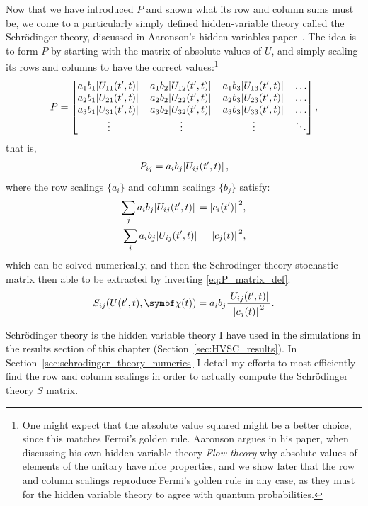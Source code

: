 Now that we have introduced $P$ and shown what its row and column sums must be, we come to a particularly simply defined hidden-variable theory called the Schr\"odinger theory, discussed in Aaronson's hidden variables paper~\cite{PhysRevA.71.032325}. The idea is to form $P$ by starting with the matrix of absolute values of $U$, and simply scaling its rows and columns to have the correct values:\footnote{One might expect that the absolute value squared might be a better choice, since this matches Fermi's golden rule. Aaronson argues in his paper, when discussing his own hidden-variable theory \emph{Flow theory} why absolute values of elements of the unitary have nice properties, and we show later that the row and column scalings reproduce Fermi's golden rule in any case, as they must for the hidden variable theory to agree with quantum probabilities.}
\begin{align}
P = \left[\begin{matrix}
a_1b_1\abs{U_{11}(t^\prime, t)} & a_1b_2\abs{U_{12}(t^\prime, t)} & a_1b_3\abs{U_{13}(t^\prime, t)}&\hdots\\
a_2b_1\abs{U_{21}(t^\prime, t)} & a_2b_2\abs{U_{22}(t^\prime, t)} & a_2b_3\abs{U_{23}(t^\prime, t)}&\hdots\\
a_3b_1\abs{U_{31}(t^\prime, t)} & a_3b_2\abs{U_{32}(t^\prime, t)} & a_3b_3\abs{U_{33}(t^\prime, t)}&\hdots\\
\vdots & \vdots & \vdots & \ddots
\end{matrix}\right],
\end{align}
that is,
\begin{align}
P_{ij} = a_i b_j \abs{U_{ij}(t^\prime, t)},
\end{align}
where the row scalings $\{a_i\}$ and column scalings $\{b_j\}$ satisfy:
\begin{align}
\sum_j a_i b_j \abs{U_{ij}(t^\prime, t)} = \abs{c_i(t^\prime)}^2,\label{eq:a_scalings}\\
\sum_i a_i b_j \abs{U_{ij}(t^\prime, t)} = \abs{c_j(t)}^2\label{eq:b_scalings},
\end{align}
which can be solved numerically, and then the Schrodinger theory stochastic matrix then able to be extracted by inverting \eqref{eq:P_matrix_def}:
\begin{align}\label{eq:schrodinger_S_matrix}
S_{ij}(U(t^\prime, t), \vec\chi(t))
= a_i b_j \frac{\abs{U_{ij}(t^\prime, t)}}{\abs{c_j(t)}^2}.
\end{align}

Schr\"odinger theory is the hidden variable theory I have used in the simulations in the results section of this chapter (Section~\ref{sec:HVSC_results}). In Section~\ref{sec:schrodinger_theory_numerics} I detail my efforts to most efficiently find the row and column scalings in order to actually compute the Schr\"odinger theory $S$ matrix.

